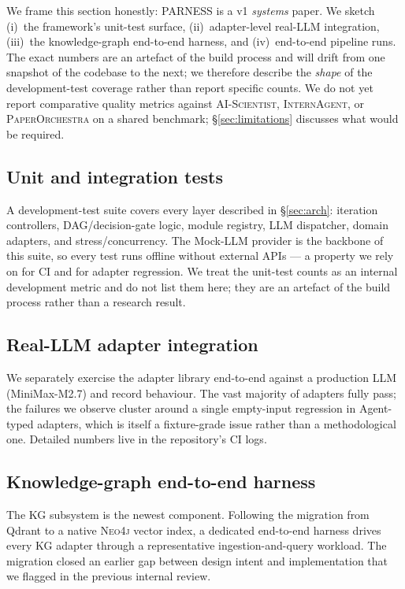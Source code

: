 \documentclass{article}
\newcommand{\parness}{\textsf{PARNESS}}
\begin{document}
We frame this section honestly: \parness{} is a v1 \emph{systems} paper.
We sketch (i)~the framework's unit-test surface, (ii)~adapter-level
real-LLM integration, (iii)~the knowledge-graph end-to-end harness, and
(iv)~end-to-end pipeline runs. The exact numbers are an artefact of the
build process and will drift from one snapshot of the codebase to the
next; we therefore describe the \emph{shape} of the development-test
coverage rather than report specific counts. We do not yet report
comparative quality metrics against \textsc{AI-Scientist},
\textsc{InternAgent}, or \textsc{PaperOrchestra} on a shared benchmark;
\S\ref{sec:limitations} discusses what would be required.

\subsection{Unit and integration tests}
\label{sec:unittests}

A development-test suite covers every layer described in
\S\ref{sec:arch}: iteration controllers, DAG/decision-gate logic,
module registry, LLM dispatcher, domain adapters, and
stress/concurrency. The Mock-LLM provider is the backbone of this
suite, so every test runs offline without external APIs --- a property
we rely on for CI and for adapter regression. We treat the unit-test
counts as an internal development metric and do not list them here;
they are an artefact of the build process rather than a research
result.

\subsection{Real-LLM adapter integration}
We separately exercise the adapter library end-to-end against a
production LLM (MiniMax-M2.7) and record behaviour. The vast majority
of adapters fully pass; the failures we observe cluster around a single
empty-input regression in Agent-typed adapters, which is itself a
fixture-grade issue rather than a methodological one. Detailed numbers
live in the repository's CI logs.

\subsection{Knowledge-graph end-to-end harness}
The KG subsystem is the newest component. Following the migration from
Qdrant to a native \textsc{Neo4j} vector index, a dedicated end-to-end
harness drives every KG adapter through a representative
ingestion-and-query workload. The migration closed an earlier gap
between design intent and implementation that we flagged in the
previous internal review.
\end{document}
